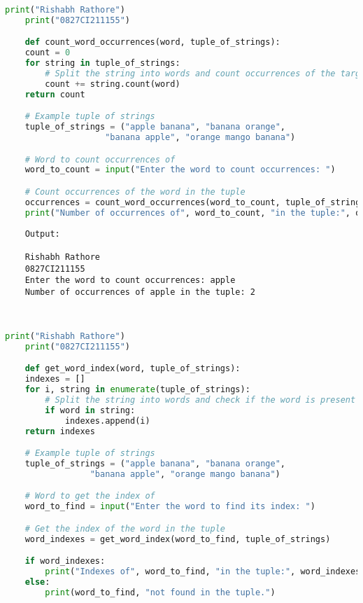 \documentclass{report}
\begin{document}
\newpage


\sol 
\begin{lstlisting}[language=Python]
	print("Rishabh Rathore")
	print("0827CI211155")

	def count_word_occurrences(word, tuple_of_strings):
    count = 0
    for string in tuple_of_strings:
        # Split the string into words and count occurrences of the target word
        count += string.count(word)
    return count

	# Example tuple of strings
	tuple_of_strings = ("apple banana", "banana orange", 
					"banana apple", "orange mango banana")

	# Word to count occurrences of
	word_to_count = input("Enter the word to count occurrences: ")

	# Count occurrences of the word in the tuple
	occurrences = count_word_occurrences(word_to_count, tuple_of_strings)
	print("Number of occurrences of", word_to_count, "in the tuple:", occurrences)

\end{lstlisting}

\begin{verbatim}
	Output:

	Rishabh Rathore
	0827CI211155
	Enter the word to count occurrences: apple
	Number of occurrences of apple in the tuple: 2



\end{verbatim}


\newpage


\sol 
\begin{lstlisting}[language=Python]
	print("Rishabh Rathore")
	print("0827CI211155")

	def get_word_index(word, tuple_of_strings):
    indexes = []
    for i, string in enumerate(tuple_of_strings):
        # Split the string into words and check if the word is present
        if word in string:
            indexes.append(i)
    return indexes

	# Example tuple of strings
	tuple_of_strings = ("apple banana", "banana orange",
				 "banana apple", "orange mango banana")

	# Word to get the index of
	word_to_find = input("Enter the word to find its index: ")

	# Get the index of the word in the tuple
	word_indexes = get_word_index(word_to_find, tuple_of_strings)

	if word_indexes:
		print("Indexes of", word_to_find, "in the tuple:", word_indexes)
	else:
		print(word_to_find, "not found in the tuple.")

\end{lstlisting}
\end{document}
